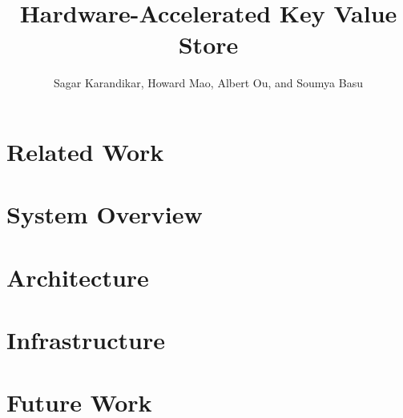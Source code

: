 \documentclass[conference]{IEEEtran}
\title{Hardware-Accelerated Key Value Store}
\author{Sagar Karandikar, Howard Mao, Albert Ou, and Soumya Basu}
\begin{document}
\maketitle



\section{Related Work}



\section{System Overview}



\section{Architecture}




\section{Infrastructure}



\section{Future Work}


\nocite{*}
\printbibliography
\end{document}

